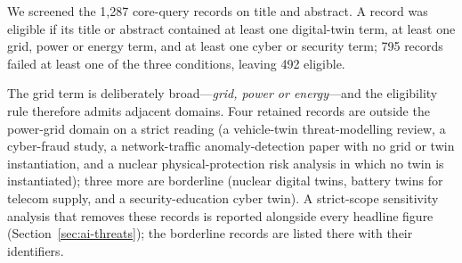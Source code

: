 \documentclass[preprint,12pt]{elsarticle}
\renewcommand{\_}{\plainunderscore\allowbreak}
\begin{document}
We screened the 1{,}287 core-query records on title and abstract. A record was eligible if
its title or abstract contained at least one digital-twin term, at least one grid, power or
energy term, and at least one cyber or security term; 795 records failed at least one of the
three conditions, leaving 492 eligible.

The grid term is deliberately broad---\emph{grid, power or energy}---and the eligibility
rule therefore admits adjacent domains. Four retained records are outside the power-grid
domain on a strict reading (a vehicle-twin threat-modelling review, a cyber-fraud study, a
network-traffic anomaly-detection paper with no grid or twin instantiation, and a nuclear
physical-protection risk analysis in which no twin is instantiated); three more are
borderline (nuclear digital twins, battery twins for telecom supply, and a security-education
cyber twin). A strict-scope sensitivity analysis that removes these records is reported
alongside every headline figure (Section~\ref{sec:ai-threats}); the borderline records are
listed there with their identifiers.
\end{document}
